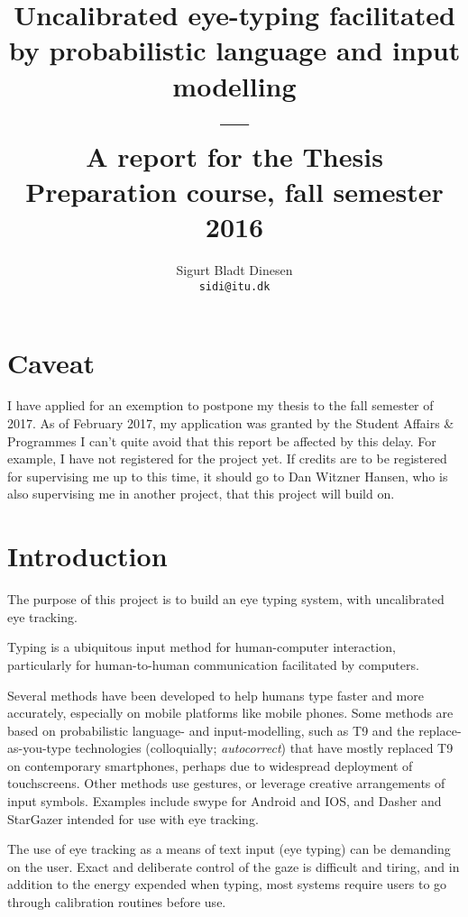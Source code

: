 \documentclass[a4paper, titlepage, 12pt, draft]{article}
\renewcommand{\%}{\scalebox{.9}{\oldpct}}
\begin{document}
\title{Uncalibrated eye-typing facilitated by probabilistic language and input modelling
\\---\\
A report for the Thesis Preparation course, fall semester 2016}
\author{
	Sigurt Bladt Dinesen
	\\\texttt{sidi@itu.dk}
}

\maketitle

\section*{Caveat}
I have applied for an exemption to postpone my thesis to the fall semester of
2017. As of February 2017, my application was granted by the Student Affairs \&
Programmes I can't quite avoid that this report be affected by this delay. For
example, I have not registered for the project yet. If credits are to be
registered for supervising me up to this time, it should go to Dan Witzner
Hansen, who is also supervising me in another project, that this project will build on.

\section*{Introduction}
The purpose of this project is to build an eye typing system, with uncalibrated eye tracking.

Typing is a ubiquitous input method for human-computer interaction, particularly for
human-to-human communication facilitated by computers.

Several methods have been developed to help humans type faster and more
accurately, especially on mobile platforms like mobile phones. Some methods are
based on probabilistic language- and input-modelling, such as T9 and the
replace-as-you-type technologies (colloquially; \textit{autocorrect}) that have mostly
replaced T9 on contemporary smartphones, perhaps due to widespread deployment of
touchscreens. Other methods use gestures, or leverage creative arrangements of
input symbols. Examples include swype for Android and IOS, and Dasher and
StarGazer intended for use with eye tracking.

The use of eye tracking as a means of text input (eye typing) can be demanding
on the user. Exact and deliberate control of the gaze is difficult and tiring,
and in addition to the energy expended when typing, most systems require
users to go through calibration routines before use.
\end{document}
